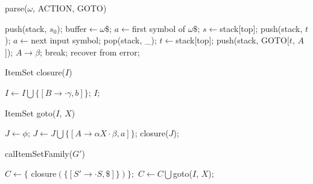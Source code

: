 \documentclass[11pt]{article}
\begin{document}
\begin{algorithm}[h]
    \caption{parse($\omega$, ACTION, GOTO)}
    \label{alg: lr0parse}
    \begin{algorithmic}[1]
    	\STATE push(stack, $s_0$);
    	\STATE buffer$\leftarrow \omega \$$;
    	\STATE $a \leftarrow$first symbol of $\omega \$$;
    	\WHILE {\TRUE}
    		\STATE $s \leftarrow$stack[top];
    			\STATE push(stack, $t$);
    			\STATE $a \leftarrow$next input symbol;
    				\STATE pop(stack, \_);
    			\ENDFOR
    			\STATE $t \leftarrow$stack[top];
    			\STATE push(stack, GOTO[$t$, $A$]);
    			\PRINT $A \rightarrow \beta$;
    			\STATE break;
    		\ELSE
    			\STATE recover from error;
    		\ENDIF
    	\ENDWHILE
    \end{algorithmic}
\end{algorithm}
\begin{algorithm}[h]
    \caption{ItemSet closure($I$)}
    \label{alg: lr1closure}
    \begin{algorithmic}[1]
    	\REPEAT
    					\STATE $I \leftarrow I \bigcup \{ [B \rightarrow \cdot \gamma, b] \}$;
    				\ENDFOR
    			\ENDFOR
    		\ENDFOR
    	\RETURN $I$;
    \end{algorithmic}
\end{algorithm}

\begin{algorithm}[h]
    \caption{ItemSet goto($I$, $X$)}
    \label{alg: lr1goto}
    \begin{algorithmic}[1]
    	\STATE $J \leftarrow \phi$;
    		\STATE $J \leftarrow J \bigcup \{ [A \rightarrow \alpha X \cdot \beta, a] \}$;
    	\ENDFOR
    	\RETURN closure($J$);
    \end{algorithmic}
\end{algorithm}

\begin{algorithm}[h]
    \caption{calItemSetFamily($G'$)}
    \label{alg: lr1itemsetfamily}
    \begin{algorithmic}[1]
    	\STATE $C \leftarrow \{$ closure$(\{ [S' \rightarrow \cdot S, \$] \}) \};$
    	\REPEAT
    					\STATE $C \leftarrow C \bigcup $goto($I$, $X$);
    				\ENDIF
    			\ENDFOR
    		\ENDFOR
    \end{algorithmic}
\end{algorithm}
\end{document}
